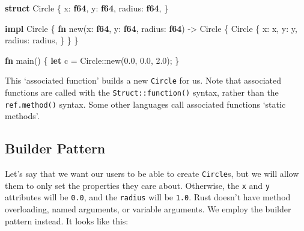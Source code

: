 \documentclass[a4paper,]{book}
\newenvironment{Shaded}{\begin{snugshade}}{\end{snugshade}}
\newcommand{\KeywordTok}[1]{\textcolor[rgb]{0.13,0.29,0.53}{\textbf{{#1}}}}
\newcommand{\DecValTok}[1]{\textcolor[rgb]{0.00,0.00,0.81}{{#1}}}
\newcommand{\NormalTok}[1]{{#1}}
\begin{document}
\begin{Shaded}
\begin{Highlighting}[]
\KeywordTok{struct} \NormalTok{Circle \{}
    \NormalTok{x: }\KeywordTok{f64}\NormalTok{,}
    \NormalTok{y: }\KeywordTok{f64}\NormalTok{,}
    \NormalTok{radius: }\KeywordTok{f64}\NormalTok{,}
\NormalTok{\}}

\KeywordTok{impl} \NormalTok{Circle \{}
    \KeywordTok{fn} \NormalTok{new(x: }\KeywordTok{f64}\NormalTok{, y: }\KeywordTok{f64}\NormalTok{, radius: }\KeywordTok{f64}\NormalTok{) -> Circle \{}
        \NormalTok{Circle \{}
            \NormalTok{x: x,}
            \NormalTok{y: y,}
            \NormalTok{radius: radius,}
        \NormalTok{\}}
    \NormalTok{\}}
\NormalTok{\}}

\KeywordTok{fn} \NormalTok{main() \{}
    \KeywordTok{let} \NormalTok{c = Circle::new(}\DecValTok{0.0}\NormalTok{, }\DecValTok{0.0}\NormalTok{, }\DecValTok{2.0}\NormalTok{);}
\NormalTok{\}}
\end{Highlighting}
\end{Shaded}

This `associated function' builds a new \texttt{Circle} for us. Note
that associated functions are called with the
\texttt{Struct::function()} syntax, rather than the
\texttt{ref.method()} syntax. Some other languages call associated
functions `static methods'.

\subsection{Builder Pattern}\label{builder-pattern}

Let's say that we want our users to be able to create \texttt{Circle}s,
but we will allow them to only set the properties they care about.
Otherwise, the \texttt{x} and \texttt{y} attributes will be
\texttt{0.0}, and the \texttt{radius} will be \texttt{1.0}. Rust doesn't
have method overloading, named arguments, or variable arguments. We
employ the builder pattern instead. It looks like this:
\end{document}
